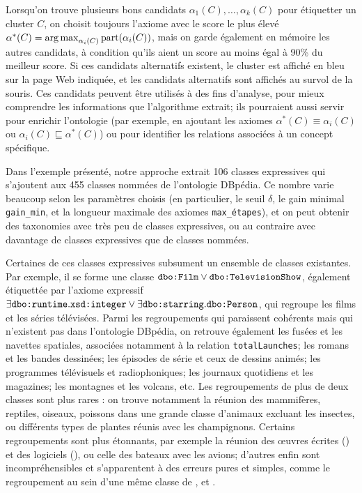 Lorsqu'on trouve plusieurs bons candidats $\alpha_1(C), \ldots, \alpha_k(C)$ pour étiquetter un cluster $C$, on choisit toujours l'axiome avec le score le plus élevé $\alpha^*(C) = \operatorname*{arg\,max}_{\alpha_i(C)} \textrm{part}(\alpha_i(C))$, mais on garde également en mémoire les autres candidats, à condition qu'ils aient un score au moins égal à 90\% du meilleur score. Si ces candidats alternatifs existent, le cluster est affiché en bleu sur la page Web indiquée, et les candidats alternatifs sont affichés au survol de la souris.
Ces candidats peuvent être utilisés à des fins d'analyse, pour mieux comprendre les informations que l'algorithme extrait; ils pourraient aussi servir pour enrichir l'ontologie (par exemple, en ajoutant les axiomes $\alpha^*(C) \equiv \alpha_i(C)$ ou $\alpha_i(C) \sqsubseteq \alpha^*(C)$) ou pour identifier les relations associées à un concept spécifique.

Dans l'exemple présenté, notre approche extrait 106 classes expressives qui s'ajoutent aux 455 classes nommées de l'ontologie DBpédia.
Ce nombre varie beaucoup selon les paramètres choisis (en particulier, le seuil $\delta$, le gain minimal \texttt{gain\_min}, et la longueur maximale des axiomes \texttt{max\_étapes}), et on peut obtenir des taxonomies avec très peu de classes expressives, ou au contraire avec davantage de classes expressives que de classes nommées.

Certaines de ces classes expressives subsument un ensemble de classes existantes. Par exemple, il se forme une classe $\texttt{dbo:Film} \lor \texttt{dbo:TelevisionShow}$, également étiquettée par l'axiome expressif $\exists \texttt{dbo:runtime}.\texttt{xsd:integer} \lor \exists \texttt{dbo:starring}.\texttt{dbo:Person}$, qui regroupe les films et les séries télévisées. Parmi les regroupements qui paraissent cohérents mais qui n'existent pas dans l'ontologie DBpédia, on retrouve également les fusées et les navettes spatiales, associées notamment à la relation \texttt{totalLaunches}; les romans et les bandes dessinées; les épisodes de série et ceux de dessins animés; les programmes télévisuels et radiophoniques; les journaux quotidiens et les magazines; les montagnes et les volcans, etc. Les regroupements de plus de deux classes sont plus rares : on trouve notamment la réunion des mammifères, reptiles, oiseaux, poissons dans une grande classe d'animaux excluant les insectes, ou différents types de plantes réunis avec les champignons. Certains regroupements sont plus étonnants, par exemple la réunion des œuvres écrites () et des logiciels (), ou celle des bateaux avec les avions; d'autres enfin sont incompréhensibles et s'apparentent à des erreurs pures et simples, comme le regroupement au sein d'une même classe de ,  et . %

